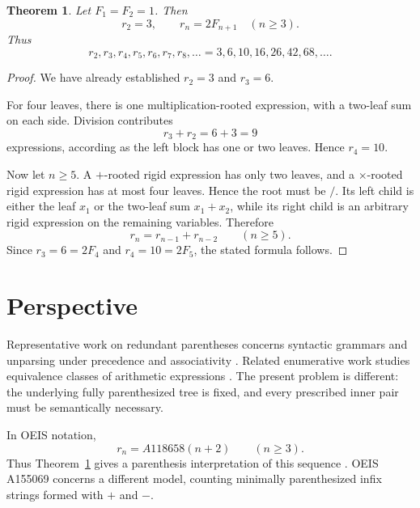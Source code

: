 \documentclass[11pt]{article}
\newtheorem{theorem}{Theorem}
\begin{document}
\begin{theorem}\label{thm:main}
Let $F_1=F_2=1$. Then
\[
 r_2=3,
 \qquad
 r_n=2F_{n+1}\quad(n\ge3).
\]
Thus
\[
 r_2,r_3,r_4,r_5,r_6,r_7,r_8,\ldots
   =3,6,10,16,26,42,68,\ldots .
\]
\end{theorem}

\begin{proof}
We have already established $r_2=3$ and $r_3=6$.

For four leaves, there is one multiplication-rooted expression, with a
two-leaf sum on each side. Division contributes
\[
 r_3+r_2=6+3=9
\]
expressions, according as the left block has one or two leaves. Hence
$r_4=10$.

Now let $n\ge5$. A $+$-rooted rigid expression has only two leaves, and a
$\times$-rooted rigid expression has at most four leaves. Hence the root must
be $/$. Its left child is either the leaf $x_1$ or the two-leaf sum
$x_1+x_2$, while its right child is an arbitrary rigid expression on the
remaining variables. Therefore
\[
 r_n=r_{n-1}+r_{n-2}\qquad(n\ge5).
\]
Since $r_3=6=2F_4$ and $r_4=10=2F_5$, the stated formula follows.
\end{proof}

\section*{Perspective}

Representative work on redundant parentheses concerns syntactic grammars and
unparsing under precedence and associativity
\cite{Ramsey,Bates,Lotfallah}. Related enumerative work studies equivalence
classes of arithmetic expressions
\cite{StosicDamnjanovicRandelovic,Cohen}. The present problem is different:
the underlying fully parenthesized tree is fixed, and every prescribed inner
pair must be semantically necessary.

In OEIS notation,
\[
 r_n=A118658(n+2)\qquad(n\ge3).
\]
Thus Theorem~\ref{thm:main} gives a parenthesis interpretation of this
sequence \cite{OEIS}. OEIS A155069 concerns a different model, counting
minimally parenthesized infix strings formed with $+$ and $-$.
\end{document}
